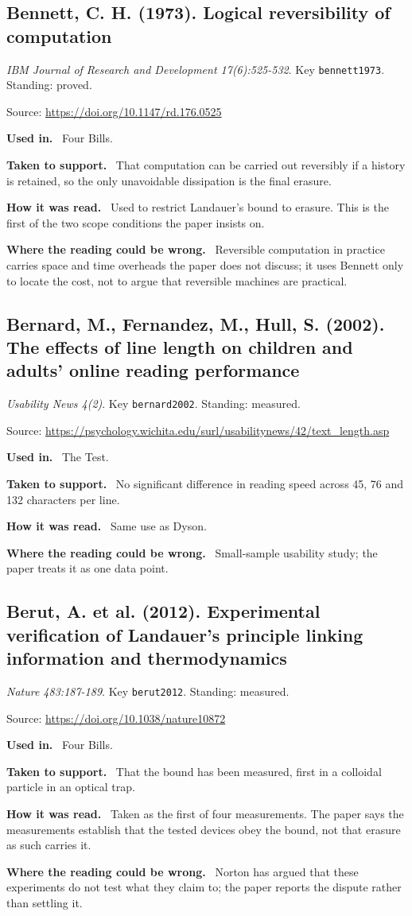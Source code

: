 \documentclass[11pt,oneside]{article}
\newcommand{\field}[1]{\par\noindent\textbf{\color{accent}#1.}\ }
\begin{document}
\hypertarget{src:bennett1973}{}
\subsection*{Bennett, C. H. (1973). Logical reversibility of computation}
\noindent\small\emph{IBM Journal of Research and Development 17(6):525-532}. Key \texttt{bennett1973}. Standing: proved.
\par\noindent\small Source: \url{https://doi.org/10.1147/rd.176.0525}
\normalsize
\field{Used in} Four Bills.
\field{Taken to support} That computation can be carried out reversibly if a history is retained, so the only unavoidable dissipation is the final erasure.
\field{How it was read} Used to restrict Landauer's bound to erasure. This is the first of the two scope conditions the paper insists on.
\field{Where the reading could be wrong} Reversible computation in practice carries space and time overheads the paper does not discuss; it uses Bennett only to locate the cost, not to argue that reversible machines are practical.

\hypertarget{src:bernard2002}{}
\subsection*{Bernard, M., Fernandez, M., Hull, S. (2002). The effects of line length on children and adults' online reading performance}
\noindent\small\emph{Usability News 4(2)}. Key \texttt{bernard2002}. Standing: measured.
\par\noindent\small Source: \url{https://psychology.wichita.edu/surl/usabilitynews/42/text_length.asp}
\normalsize
\field{Used in} The Test.
\field{Taken to support} No significant difference in reading speed across 45, 76 and 132 characters per line.
\field{How it was read} Same use as Dyson.
\field{Where the reading could be wrong} Small-sample usability study; the paper treats it as one data point.

\hypertarget{src:berut2012}{}
\subsection*{Berut, A. et al. (2012). Experimental verification of Landauer's principle linking information and thermodynamics}
\noindent\small\emph{Nature 483:187-189}. Key \texttt{berut2012}. Standing: measured.
\par\noindent\small Source: \url{https://doi.org/10.1038/nature10872}
\normalsize
\field{Used in} Four Bills.
\field{Taken to support} That the bound has been measured, first in a colloidal particle in an optical trap.
\field{How it was read} Taken as the first of four measurements. The paper says the measurements establish that the tested devices obey the bound, not that erasure as such carries it.
\field{Where the reading could be wrong} Norton has argued that these experiments do not test what they claim to; the paper reports the dispute rather than settling it.
\end{document}
